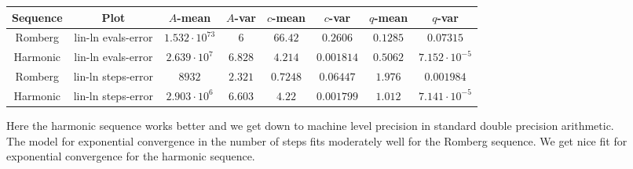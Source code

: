 \begin{table}[H]
    \centering\small
     \begin{tabular}{c|c||c|c|c|c|c|c}
Sequence & Plot & \(A\)-mean & \(A\)-var & \(c\)-mean & \(c\)-var & \(q\)-mean & \(q\)-var\\\hline
Romberg & lin-ln evals-error & \(1.532\cdot 10^{73}\) & \(6\) & \(66.42\) & \(0.2606\) & \(0.1285\) & \(0.07315\) \\
Harmonic & lin-ln evals-error & \(2.639\cdot 10^7\) & \(6.828\) & \(4.214\) & \(0.001814\) & \(0.5062\) & \(7.152\cdot 10^{-5}\) \\
Romberg & lin-ln steps-error & \(8932\) & \(2.321\) & \(0.7248\) & \(0.06447\) & \(1.976\) & \(0.001984\) \\
Harmonic & lin-ln steps-error & \(2.903\cdot 10^6\) & \(6.603\) & \(4.22\) & \(0.001799\) & \(1.012\) & \(7.141\cdot 10^{-5}\) \\
    \end{tabular}
    \label{tab:my_label}
\end{table}

Here the harmonic sequence works better and we get down to machine level precision in standard double precision arithmetic.\\

The model for exponential convergence in the number of steps fits moderately well for the Romberg sequence. We get nice fit for exponential convergence for the harmonic sequence.


